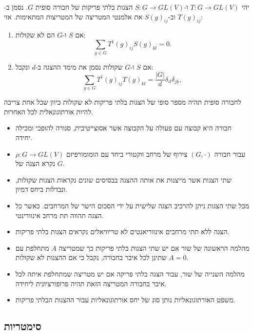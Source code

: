 \documentclass{tstextbook}
\begin{document}
\begin{theorem}[האורתוגונאליות]
יהי \(T:G\to GL(V)\) ו-\(S:G\to GL(V)\) הצגות בלתי פריקות של חבורה סופית \(G\). נסמן ב-\(T(g)_{ij}\) וב-\(S(g)_{ij}\) את אלמנטי המטריצה של המטריצות המתאימות. אזי:

  \begin{enumerate}
    \item אם \(S\) ו-\(G\) הם לא שקולות: 
$$\sum_{g\in G}T^{\dagger}(g)_{i j}S(g)_{k l}=0.$$


    \item אם \(S\) ו-\(G\) שקולות נסמן את מימד ההצגה ב-\(d\) ונקבל: 
$$\sum_{g\in G}T^{\dagger}(g)_{i j}T(g)_{k l}=\frac{|G|}{d}\delta_{i l}\delta_{j k},$$


  \end{enumerate}
\end{theorem}
\begin{corollary}
לחבורה סופית תהיה מספר סופי של הצגות בלתי פריקות לא שקולות כיוון שכל אחת צריכה להיות אורתוגונאלית לכל האחרות.

\end{corollary}
\begin{summary}
  \begin{itemize}
    \item חבורה היא קבוצה עם פעולה על הקבוצה אשר אסוצייטיבית, סגורה להופכי ומכילה יחידה.
    \item עבור חבורה \(\left( G,\cdot \right)\) צירוף של מרחב ווקטורי ביחד עם הומומורפיזם \(\rho:G\to GL(V)\) נקרא הצגה של \(G\).
    \item שתי הצגות אשר מייצגות את אותה ההצגה בבסיסים שונים נקראות הצגות שקולות, ונבדלות ביחס דמיון.
    \item מכל שתי הצגות ניתן להרכיב הצגה שלישית על ידי הסכום הישר של המרחבים. כאשר כל הצגה תהווה תת מרחב אינוורינטי.
    \item הצגה ללא תתי מרחבים אינווריאנטים לא טריוויאלים נקראים הצגות בלתי פריקות.
    \item מהלמה הראשונה של שור אם יש שתי הצגות בלתי פריקות כך שמטריצה \(A\) מתחלפת עם שתינן לכל איבר בחבורה, נקבל כי אם ההצגות לא שקולות \(A=0\).
    \item מהלמה השנייה של שור, עבור הצגה בלתי פריקה אם יש מטריצה שמתחלפת איתה לכל איבר בחבורה המטריצה הזאת תהיה פרופורציונית ליחידה.
    \item משפט האורתוגונאליות נותן סוג של יחס אורתוגונאליות עבור ההצגות הבלתי פריקות.
  \end{itemize}
\end{summary}
\subsection{סימטריות}
\end{document}
